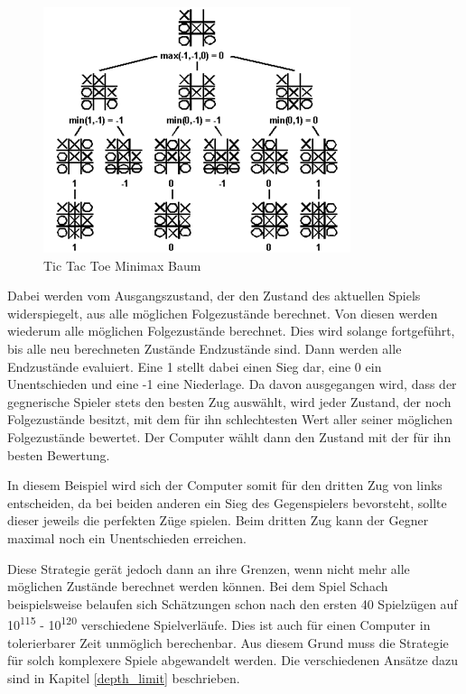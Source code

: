 \begin{figure}[h]
\centering
\includegraphics[width=\textwidth/5*3]{images/tictactoe_minimax_tree.png}

\caption{Tic Tac Toe Minimax Baum \cite{Kurenkov2019}}\label{fig:tictactoe_minimax_tree}
\end{figure}

Dabei werden vom Ausgangszustand, der den Zustand des aktuellen Spiels widerspiegelt, aus alle möglichen Folgezustände berechnet. Von diesen werden wiederum alle möglichen Folgezustände berechnet. Dies wird solange fortgeführt, bis alle neu berechneten Zustände Endzustände sind. Dann werden alle Endzustände evaluiert. Eine 1 stellt dabei einen Sieg dar, eine 0 ein Unentschieden und eine -1 eine Niederlage. Da davon ausgegangen wird, dass der gegnerische Spieler stets den besten Zug auswählt, wird jeder Zustand, der noch Folgezustände besitzt, mit dem für ihn schlechtesten Wert aller seiner möglichen Folgezustände bewertet. Der Computer wählt dann den Zustand mit der für ihn besten Bewertung. \cite{Russell2010}

In diesem Beispiel wird sich der Computer somit für den dritten Zug von links entscheiden, da bei beiden anderen ein Sieg des Gegenspielers bevorsteht, sollte dieser jeweils die perfekten Züge spielen. Beim dritten Zug kann der Gegner maximal noch ein Unentschieden erreichen.

Diese Strategie gerät jedoch dann an ihre Grenzen, wenn nicht mehr alle möglichen Zustände berechnet werden können. Bei dem Spiel Schach beispielsweise belaufen sich Schätzungen schon nach den ersten 40 Spielzügen auf 10\textsuperscript{115} - 10\textsuperscript{120} verschiedene Spielverläufe. \cite{Bonsdorff1978} Dies ist auch für einen Computer in tolerierbarer Zeit unmöglich berechenbar. Aus diesem Grund muss die Strategie für solch komplexere Spiele abgewandelt werden. Die verschiedenen Ansätze dazu sind in Kapitel \ref{depth_limit} beschrieben.


